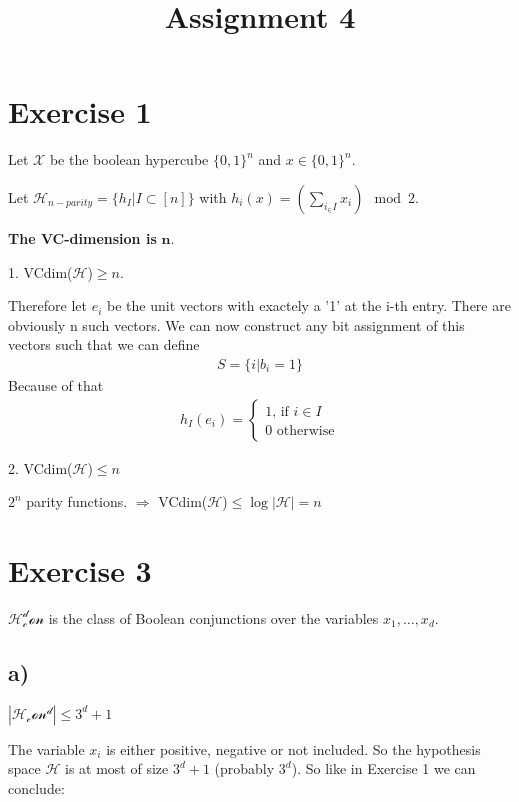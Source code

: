\documentclass{article}
\title{Assignment 4}
\begin{document}
 \setlength{\parindent}{0em} 
\maketitle
\section*{Exercise 1}
Let $\mathcal{X}$ be the boolean hypercube $\{0,1\}^n$ and $x\in\{0,1\}^n$. 

Let $\mathcal{H}_{n-parity}=\{h_I|I\subset [n]\} $ with $h_i(x) =
(\sum_{i_\in I} x_i) \mod 2$.

\textbf{The VC-dimension is } $\mathbf{n}$.

1. VCdim($\mathcal{H}$)$\geq n$.

Therefore let $e_i$ be the unit vectors with exactely a '1' at the i-th entry.
There are obviously n such vectors. We can now construct any bit assignment of
this vectors such that we can define 
\begin{align*}
S = \{ i| b_i = 1\}
\end{align*}
Because of that 
\begin{align*}
h_I(e_i) = \begin{cases}
1 \text{, if }i\in I\\
0 \text{ otherwise}
\end{cases}
\end{align*}

2. VCdim($\mathcal{H}$)$\leq n$ 

$2^n$ parity functions. $\Rightarrow$ VCdim($\mathcal{H}$)$\leq
\log|\mathcal{H}| = n$

\section*{Exercise 3}
$\mathcal{H^d_con}$ is the class of Boolean conjunctions over the variables
$x_1,\ldots,x_d$.
\subsection*{a)}
$\mathbf{|\mathcal{H_con^d}|}\leq 3^d + 1$



The variable $x_i$ is either positive, negative or not included. So the
hypothesis space $\mathcal{H}$ is at most of size $3^d + 1$ (probably $3^d$). So
like in Exercise 1 we can conclude:
\end{document}
